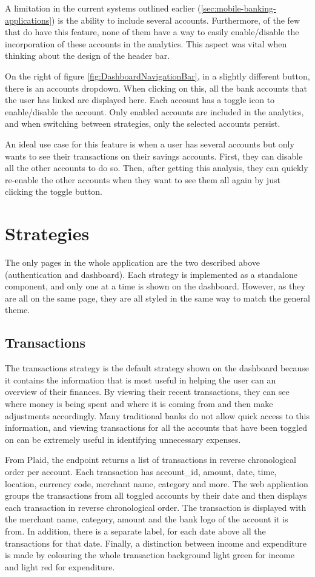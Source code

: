 A limitation in the current systems outlined earlier (\ref{sec:mobile-banking-applications}) is the ability to include several accounts. Furthermore, of the few that do have this feature, none of them have a way to easily enable/disable the incorporation of these accounts in the analytics. This aspect was vital when thinking about the design of the header bar.

On the right of figure \ref{fig:DashboardNavigationBar}, in a slightly different button, there is an accounts dropdown. When clicking on this, all the bank accounts that the user has linked are displayed here. Each account has a toggle icon to enable/disable the account. Only enabled accounts are included in the analytics, and when switching between strategies, only the selected accounts persist.

An ideal use case for this feature is when a user has several accounts but only wants to see their transactions on their savings accounts. First, they can disable all the other accounts to do so. Then, after getting this analysis, they can quickly re-enable the other accounts when they want to see them all again by just clicking the toggle button.

\section{Strategies}
The only pages in the whole application are the two described above (authentication and dashboard). Each strategy is implemented as a standalone component, and only one at a time is shown on the dashboard. However, as they are all on the same page, they are all styled in the same way to match the general theme.

\subsection{Transactions}
The transactions strategy is the default strategy shown on the dashboard because it contains the information that is most useful in helping the user can an overview of their finances. By viewing their recent transactions, they can see where money is being spent and where it is coming from and then make adjustments accordingly. Many traditional banks do not allow quick access to this information, and viewing transactions for all the accounts that have been toggled on can be extremely useful in identifying unnecessary expenses.

From Plaid, the endpoint returns a list of transactions in reverse chronological order per account. Each transaction has account\_id, amount, date, time, location, currency code, merchant name, category and more. The web application groups the transactions from all toggled accounts by their date and then displays each transaction in reverse chronological order. The transaction is displayed with the merchant name, category, amount and the bank logo of the account it is from. In addition, there is a separate label, for each date above all the transactions for that date. Finally, a distinction between income and expenditure is made by colouring the whole transaction background light green for income and light red for expenditure.

